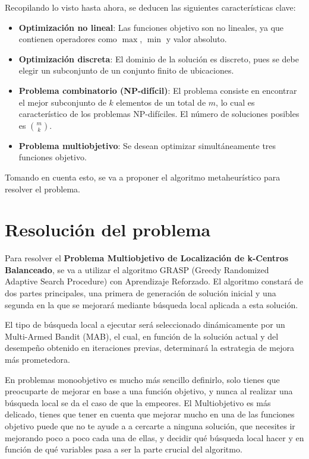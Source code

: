 \documentclass[12pt,a4paper]{book}
\begin{document}
Recopilando lo visto hasta ahora, se deducen las siguientes características clave:

\begin{itemize}
    \item \textbf{Optimización no lineal}: Las funciones objetivo son no lineales, ya que contienen operadores como $\max$, $\min$ y valor absoluto.
    
    \item \textbf{Optimización discreta}: El dominio de la solución es discreto, pues se debe elegir un subconjunto de un conjunto finito de ubicaciones.
    
    \item \textbf{Problema combinatorio (NP-difícil)}: El problema consiste en encontrar el mejor subconjunto de $k$ elementos de un total de $m$, lo cual es característico de los problemas NP-difíciles. El número de soluciones posibles es $\binom{m}{k}$.
    
    \item \textbf{Problema multiobjetivo}: Se desean optimizar simultáneamente tres funciones objetivo.
\end{itemize}

Tomando en cuenta esto, se va a proponer el algoritmo metaheurístico para resolver el problema.


\chapter{Resolución del problema}
Para resolver el \textbf{Problema Multiobjetivo de Localización de k-Centros Balanceado}, se va a utilizar el algoritmo GRASP (Greedy Randomized Adaptive Search Procedure) con Aprendizaje Reforzado.
El algoritmo constará de dos partes principales, una primera de generación de solución inicial y una segunda en la que se mejorará mediante búsqueda local aplicada a esta solución.

El tipo de búsqueda local a ejecutar será seleccionado dinámicamente por un Multi-Armed Bandit (MAB), el cual, en función de la solución actual y del desempeño obtenido en iteraciones previas, determinará la estrategia de mejora más prometedora.

En problemas monoobjetivo es mucho más sencillo definirlo, solo tienes que preocuparte de mejorar en base a una función objetivo, y nunca al realizar una búsqueda local se da el caso de que la empeores. El Multiobjetivo es más delicado,
tienes que tener en cuenta que mejorar mucho en una de las funciones objetivo puede que no te ayude a a cercarte a ninguna solución, que necesites ir mejorando poco a poco cada una de ellas, y decidir qué búsqueda local hacer y en función de qué variables pasa
a ser la parte crucial del algoritmo.
\end{document}
